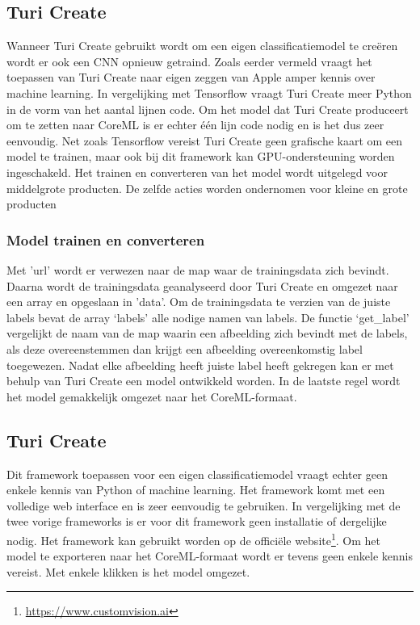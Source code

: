 \subsection{Turi Create}
\label{ssec:Turi Create}

Wanneer Turi Create gebruikt wordt om een eigen classificatiemodel te creëren wordt er ook een CNN opnieuw getraind. Zoals eerder vermeld vraagt het toepassen van Turi Create naar eigen zeggen van Apple amper kennis over machine learning. In vergelijking met Tensorflow vraagt Turi Create meer Python in de vorm van het aantal lijnen code. Om het model dat Turi Create produceert om te zetten naar CoreML is er echter één lijn code nodig en is het dus zeer eenvoudig. Net zoals Tensorflow vereist Turi Create geen grafische kaart om een model te trainen, maar ook bij dit framework kan GPU-ondersteuning worden ingeschakeld. Het trainen en converteren van het model wordt uitgelegd voor middelgrote producten. De zelfde acties worden ondernomen voor kleine en grote producten

\subsubsection{Model trainen en converteren}
\label{sssec:Model trainen en converteren}


Met 'url' wordt er verwezen naar de map waar de trainingsdata zich bevindt. Daarna wordt de trainingsdata geanalyseerd door Turi Create en omgezet naar een array en opgeslaan in 'data'. Om de trainingsdata te verzien van de juiste labels bevat de array ‘labels’ alle nodige namen van labels. De functie ‘get\_label’ vergelijkt de naam van de map waarin een afbeelding zich bevindt met de labels, als deze overeenstemmen dan krijgt een afbeelding overeenkomstig label toegewezen. Nadat elke afbeelding heeft juiste label heeft gekregen kan er met behulp van Turi Create een model ontwikkeld worden. In de laatste regel wordt het model gemakkelijk omgezet naar het CoreML-formaat.

\subsection{Turi Create}
\label{ssec:Turi Create}

Dit framework toepassen voor een eigen classificatiemodel vraagt echter geen enkele kennis van Python of machine learning. Het framework komt met een volledige web interface en is zeer eenvoudig te gebruiken.
In vergelijking met de twee vorige frameworks is er voor dit framework geen installatie of dergelijke nodig. Het framework kan gebruikt worden op de officiële website\footnote{\url{https://www.customvision.ai}}. Om het model te exporteren naar het CoreML-formaat wordt er tevens geen enkele kennis vereist. Met enkele klikken is het model omgezet. 


